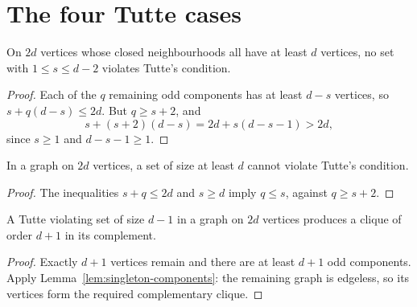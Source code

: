 \section{The four Tutte cases}

\begin{lemma}
  \label{lem:barrier-between}
  \leanok
  On $2d$ vertices whose closed neighbourhoods all have at least $d$ vertices, no set with
  $1 \le s \le d - 2$ violates Tutte's condition.
\end{lemma}
\begin{proof}
  Each of the $q$ remaining odd components has at least $d - s$ vertices, so
  $s + q(d - s) \le 2d$. But $q \ge s + 2$, and
  \[
    s + (s + 2)(d - s) = 2d + s(d - s - 1) > 2d,
  \]
  since $s \ge 1$ and $d - s - 1 \ge 1$.
\end{proof}

\begin{lemma}
  \label{lem:barrier-half}
  \leanok
  In a graph on $2d$ vertices, a set of size at least $d$ cannot violate Tutte's
  condition.
\end{lemma}
\begin{proof}
  The inequalities $s + q \le 2d$ and $s \ge d$ imply $q \le s$, against $q \ge s + 2$.
\end{proof}

\begin{lemma}
  \label{lem:barrier-d-minus-one}
  \leanok
  A Tutte violating set of size $d - 1$ in a graph on $2d$ vertices produces a clique of
  order $d + 1$ in its complement.
\end{lemma}
\begin{proof}
  Exactly $d + 1$ vertices remain and there are at least $d + 1$ odd components. Apply
  Lemma~\ref{lem:singleton-components}: the remaining graph is edgeless, so its vertices
  form the required complementary clique.
\end{proof}

